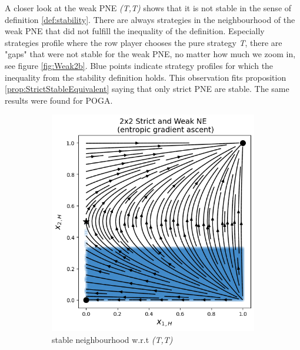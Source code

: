A closer look at the weak PNE \textit{(T,T)} shows that it is not stable in the sense of definition \ref{def:stability}. There are always strategies in the neighbourhood of the weak PNE that did not fulfill the inequality of the definition. Especially strategies profile where the row player chooses the pure strategy \textit{T}, there are "gaps" that were not stable for the weak PNE, no matter how much we zoom in, see figure \ref{fig:Weak2b}. Blue points indicate strategy profiles for which the inequality from the stability definition holds. This observation fits proposition \ref{prop:StrictStableEquivalent} saying that only strict PNE are stable. The same results were found for POGA. 

\begin{figure}[H]
\captionsetup{justification=centering}
\centering
\begin{subfigure}{.48\textwidth}
    \centering
    \includegraphics[width=\textwidth]{logos/Weak3.png}
    \caption{stable neighbourhood w.r.t \textit{(T,T)}}
    \label{fig:Weak2a}
\end{subfigure}%
\begin{subfigure}{.52\textwidth}
    \centering

\end{subfigure}
\end{figure}
